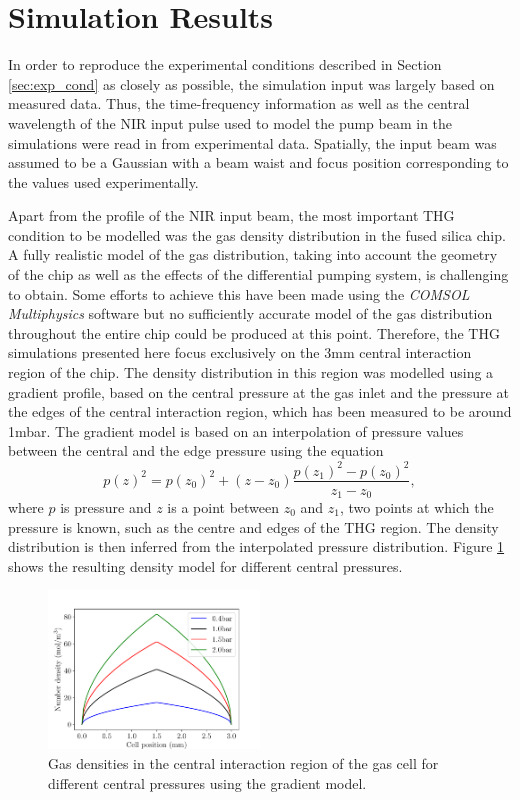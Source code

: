 \documentclass[a4paper]{jpconf}
\begin{document}
\section{Simulation Results}
In order to reproduce the experimental conditions described in Section \ref{sec:exp_cond} as closely as possible, the simulation input was largely based on measured data. Thus, the time-frequency information as well as the central wavelength of the NIR input pulse used to model the pump beam in the simulations were read in from experimental data. Spatially, the input beam was assumed to be a Gaussian with a beam waist and focus position corresponding to the values used experimentally. \par 
Apart from the profile of the NIR input beam, the most important THG condition to be modelled was the gas density distribution in the fused silica chip. A fully realistic model of the gas distribution, taking into account the geometry of the chip as well as the effects of the differential pumping system, is challenging to obtain. Some efforts to achieve this have been made using the \textit{COMSOL Multiphysics} software but no sufficiently accurate model of the gas distribution throughout the entire chip could be produced at this point. Therefore, the THG simulations presented here focus exclusively on the 3mm central interaction region of the chip. The density distribution in this region was modelled using a gradient profile, based on the central pressure at the gas inlet and the pressure at the edges of the central interaction region, which has been measured to be around 1mbar. The gradient model is based on an interpolation of pressure values between the central and the edge pressure using the equation 
\begin{equation}
p(z)^2 = p(z_0)^2 + (z-z_0) \frac{p(z_1)^2 - p(z_0)^2}{z_1 - z_0}, 
\end{equation}
where $p$ is pressure and $z$ is a point between $z_0$ and $z_1$, two points at which the pressure is known, such as the centre and edges of the THG region. The density distribution is then inferred from the interpolated pressure distribution. Figure \ref{im:grad} shows the resulting density model for different central pressures. \par 
\begin{figure}[h]
\centering
\includegraphics[width=0.5\textwidth]{im/grad_model}
\caption{Gas densities in the central interaction region of the gas cell for different central pressures using the gradient model.}\label{im:grad}
\end{figure} 
\end{document}
